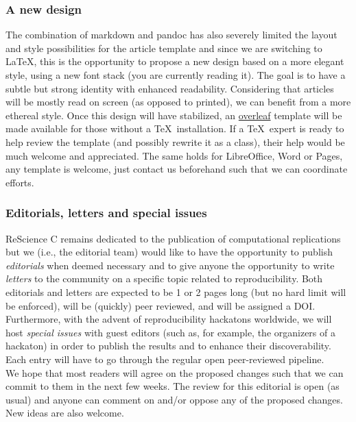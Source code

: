 \subsubsection{A new design}

The combination of markdown and pandoc has also severely limited the layout and
style possibilities for the article template and since we are switching to
\LaTeX, this is the opportunity to propose a new design based on a more elegant
style, using a new font stack\supercite{SourceSerifPro:2014, Roboto:2011,
  SourceCodePro:2012} (you are currently reading it). The goal is to have a
subtle but strong identity with enhanced readability. Considering that articles
will be mostly read on screen (as opposed to printed), we can benefit from a
more ethereal style. Once this design will have stabilized, an
\href{https://www.overleaf.com/}{overleaf} template will be made available for
those without a \TeX~installation. If a \TeX~expert is ready to help review
the template (and possibly rewrite it as a class), their help would be much
welcome and appreciated. The same holds for LibreOffice, Word or Pages, any
template is welcome, just contact us beforehand such that we can coordinate
efforts.


\subsubsection{Editorials, letters and special issues}

ReScience C remains dedicated to the publication of computational replications
but we (i.e., the editorial team) would like to have the opportunity to
publish \emph{editorials} when deemed necessary and to give anyone the
opportunity to write \emph{letters} to the community on a specific topic
related to reproducibility. Both editorials and letters are expected to be 1 or
2 pages long (but no hard limit will be enforced), will be (quickly) peer reviewed,
and will be assigned a DOI. Furthermore, with the advent of reproducibility
hackatons worldwide, we will host {\em special issues} with guest editors (such
as, for example, the organizers of a hackaton) in order to publish the results
and to enhance their discoverability. Each entry will have to go through the
regular open peer-reviewed pipeline.\\


We hope that most readers will agree on the proposed changes such that we can
commit to them in the next few weeks. The review for this editorial is open (as
usual) and anyone can comment on and/or oppose any of the proposed changes. New
ideas are also welcome.
